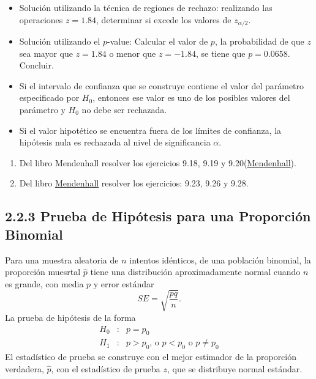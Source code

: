 \begin{frame}
\begin{frame}
\begin{Sol}
\begin{itemize}
\item Soluci\'on utilizando la t\'ecnica de regiones de rechazo:\medskip
realizando las operaciones
$z=1.84$, determinar si excede los valores de $z_{\alpha/2}$.
\item Soluci\'on utilizando el $p$-value:\medskip
Calcular el valor de $p$, la probabilidad de que $z$ sea mayor que $z=1.84$ o menor que $z=-1.84$, se tiene que $p=0.0658$. Concluir.
\end{itemize}
\end{Sol}



\begin{itemize}
\item Si el intervalo de confianza que se construye contiene el valor del par\'ametro especificado por $H_{0}$, entonces ese valor es uno de los posibles valores del par\'ametro y $H_{0}$ no debe ser rechazada.

\item Si el valor hipot\'etico se encuentra fuera de los l\'imites de confianza, la hip\'otesis nula es rechazada al nivel de significancia $\alpha$.
\end{itemize}

\begin{enumerate}
\item Del libro Mendenhall resolver los ejercicios 9.18, 9.19 y 9.20(\href{https://cu.uacm.edu.mx/nextcloud/index.php/f/202873}{Mendenhall}).

\item Del libro \href{https://cu.uacm.edu.mx/nextcloud/index.php/f/202873}{Mendenhall} resolver los ejercicios: 9.23, 9.26 y 9.28.
\end{enumerate}



\subsection{2.2.3 Prueba de Hip\'otesis para una Proporci\'on Binomial}


Para una muestra aleatoria de $n$ intentos id\'enticos, de una poblaci\'on binomial, la proporci\'on muesrtal $\hat{p}$ tiene una distribuci\'on aproximadamente normal cuando $n$ es grande, con media $p$ y error est\'andar
$$SE=\sqrt{\frac{pq}{n}}.$$
La prueba de hip\'otesis de la forma
\begin{eqnarray*}
H_{0}&:&p=p_{0}\\
H_{1}&:&p>p_{0}\textrm{, o }p<p_{0}\textrm{ o }p\neq p_{0}
\end{eqnarray*}
El estad\'istico de prueba se construye con el mejor estimador de la proporci\'on verdadera, $\hat{p}$, con el estad\'istico de prueba $z$, que se distribuye normal est\'andar.




\end{frame}
\end{frame}
